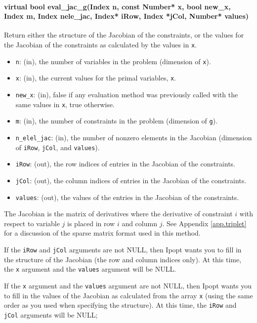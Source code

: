 \documentclass[letter,10pt]{article}
\begin{document}
{\paragraph{virtual bool eval\_jac\_g(Index n, const Number* x, bool new\_x, \\
                       Index m, Index nele\_jac, Index* iRow, 
        Index *jCol, Number* values)}
$\;$ \\
Return either the structure of the Jacobian of the constraints, or the values for the 
Jacobian of the constraints as calculated by the values in {\tt x}.
\begin{itemize}
\item {\tt n}: (in), the number of variables in the problem (dimension of {\tt x}). 
\item {\tt x}: (in), the current values for the primal variables, {\tt x}.
\item {\tt new\_x}: (in), false if any evaluation method was previously called 
        with the same values in {\tt x}, true otherwise.
\item {\tt m}: (in), the number of constraints in the problem (dimension of {\tt g}).
\item {\tt n\_elel\_jac}: (in), the number of nonzero elements in the 
        Jacobian (dimension of {\tt iRow}, {\tt jCol}, and {\tt values}).
\item {\tt iRow}: (out), the row indices of entries in the Jacobian of the constraints.
\item {\tt jCol}: (out), the column indices of entries in the Jacobian of the constraints.
\item {\tt values}: (out), the values of the entries in the Jacobian of the constraints.
\end{itemize}

The Jacobian is the matrix of derivatives where
the derivative of constraint $i$ with respect to variable $j$ is
placed in row $i$ and column $j$. See Appendix \ref{app.triplet} for a discussion of 
the sparse matrix format used in this method.

If the {\tt iRow} and {\tt jCol} arguments are not NULL, then Ipopt
wants you to fill in the structure of the Jacobian (the row and column
indices only). At this time, the {\tt x} argument and the {\tt values}
argument will be NULL.

If the {\tt x} argument and the {\tt values} argument are not NULL,
then Ipopt wants you to fill in the values of the Jacobian as
calculated from the array {\tt x} (using the same order as you used
when specifying the structure). At this time, the {\tt iRow} and {\tt
jCol} arguments will be NULL;

}
\end{document}
